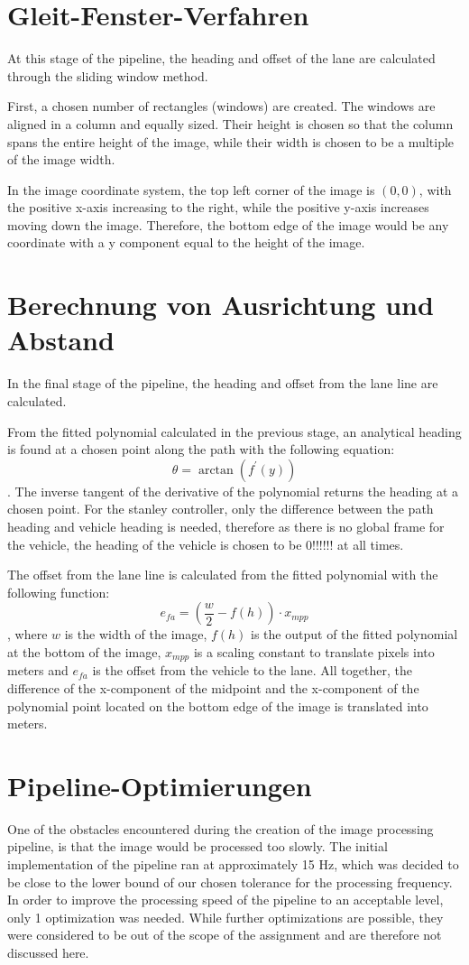 \documentclass[arbeit=studie,oneside,BCOR=12mm]{ArbeitRST}
\begin{document}
\section{Gleit-Fenster-Verfahren}
At this stage of the pipeline, the heading and offset of the lane are calculated 
through the sliding window method.

First, a chosen number of rectangles (windows) are created. The windows are 
aligned in a column and equally sized. Their height is chosen so that the column
spans the entire height of the image, while their width is chosen to be a 
multiple of the image width.

In the image coordinate system, the top left corner of the image is $(0, 0)$, 
with the positive x-axis increasing to the right, while the positive y-axis 
increases moving down the image. Therefore, the bottom edge of the image would 
be any coordinate with a y component equal to the height of the image.

\section{Berechnung von Ausrichtung und Abstand}
In the final stage of the pipeline, the heading and offset from the lane line 
are calculated. 
 
From the fitted polynomial calculated in the previous stage, an analytical 
heading is found at a chosen point along the path with the following equation:
$$\theta = \arctan(f^\prime(y))$$.
The inverse tangent of the derivative of the polynomial returns the heading at
a chosen point. For the stanley controller, only the difference between the 
path heading and vehicle heading is needed, therefore as there is no global 
frame for the vehicle, the heading of the vehicle is chosen to be 0!!!!!! at 
all times. 

The offset from the lane line is calculated from the fitted polynomial with 
the following function: $$e_{fa} = (\frac{w}{2} - f(h))\cdot x_{mpp}$$, where 
$w$ is the width of the image, $f(h)$ is the output of the fitted polynomial at 
the bottom of the image, $x_{mpp}$ is a scaling constant to translate pixels 
into meters and $e_{fa}$ is the offset from the vehicle to the lane. All 
together, the difference of the x-component of the midpoint and the 
x-component of the polynomial point located on the bottom edge of the image is
translated into meters.

\section{Pipeline-Optimierungen}
One of the obstacles encountered during the creation of the image processing
pipeline, is that the image would be processed too slowly. 
The initial implementation of the pipeline ran at approximately 15 Hz, which was
decided to be close to the lower bound of our chosen tolerance for the 
processing frequency. 
In order to improve the processing speed of the pipeline to an acceptable level,
only 1 optimization was needed. 
While further optimizations are possible, they were considered to be out of the
scope of the assignment and are therefore not discussed here.
\end{document}
